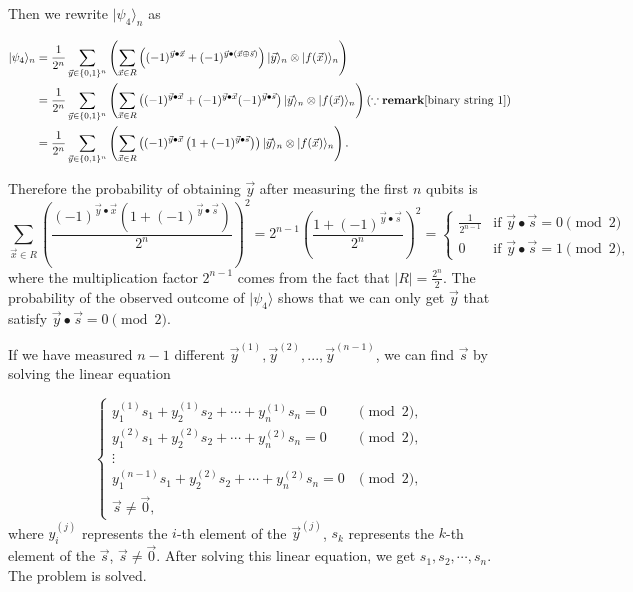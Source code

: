 Then we rewrite $|\psi_4\rangle_n$ as

$$
\begin{aligned}
|\psi_4\rangle_n 
& =\frac{1}{2^{n}} \sum_{\vec{y} \in \{0,1\}^n}\left(\sum_{\vec{x} \in R} \left((-1)^{\vec{y} \bullet \vec{x}} +(-1)^{\vec{y} \bullet(\vec{x} \oplus \vec{s})}\right)|\vec{y}\rangle_n \otimes |f(\vec{x})\rangle_n\right) \\
& = \frac{1}{2^n} \sum_{\vec{y} \in \{0,1\}^n} \left( \sum_{\vec{x} \in R} \left((-1)^{\vec{y} \bullet \vec{x}} + (-1)^{\vec{y} \bullet \vec{x}} (-1)^{\vec{y} \bullet \vec{s}}\right) |\vec{y}\rangle_n \otimes |f(\vec{x})\rangle_n \right)(\because \mathbf{remark} \ref{binary string 1})\\
& = \frac{1}{2^n} \sum_{\vec{y} \in \{0,1\}^n}\left(\sum_{\vec{x} \in R} \left((-1)^{\vec{y} \bullet \vec{x}}\left(1+(-1)^{\vec{y} \bullet \vec{s}}\right)\right)|\vec{y}\rangle_n \otimes|f(\vec{x})\rangle_n\right).
\end{aligned}
$$

Therefore the probability of obtaining $\vec{y}$ after measuring the first $n$ qubits is
$$
\sum_{\vec{x} \in R}\left(\frac{(-1)^{\vec{y} \bullet \vec{x}}\left(1+(-1)^{\vec{y} \bullet \vec{s}}\right)}{2^n}\right)^2=2^{n-1}\left(\frac{1+(-1)^{\vec{y} \bullet \vec{s}}}{2^n}\right)^2=
\begin{cases}
\frac{1}{2^{n-1}} & \text{if } \vec{y} \bullet \vec{s} = 0 \pmod{2} \\
0 & \text{if } \vec{y} \bullet \vec{s} = 1 \pmod{2},
\end{cases}
$$
where the multiplication factor $2^{n-1}$ comes from the fact that $|R|=\frac{2^n}{2}$. The probability of the observed outcome of $|\psi_4\rangle$ shows that we can only get $\vec{y}$ that satisfy $\vec{y} \bullet \vec{s} = 0 \pmod{2}$.




If we have measured $n-1$ different $\vec{y}^{(1)}, \vec{y}^{(2)},..., \vec{y}^{(n-1)}$, we can find $\vec{s}$ by solving the linear equation 

$$
\begin{cases}
y_1^{(1)} s_1+y_2^{(1)} s_2+\cdots+y_n^{(1)} s_n=0 & \pmod{2}, \\ 
y_1^{(2)} s_1+y_2^{(2)} s_2+\cdots+y_n^{(2)} s_n=0 & \pmod{2}, \\ 
\vdots \\ 
y_1^{(n-1)} s_1+y_2^{(2)} s_2+\cdots+y_n^{(2)} s_n=0 & \pmod{2}, \\
\vec{s} \neq \vec{0}, & 
\end{cases}
$$
where $y_i^{(j)}$ represents the $i$-th element of the $\vec{y}^{(j)}$, $s_k$ represents the $k$-th element of the $\vec{s}$, $\vec{s} \neq \vec{0}$. After solving this linear equation, we get $s_1, s_2, \cdots, s_n$. The problem is solved.


